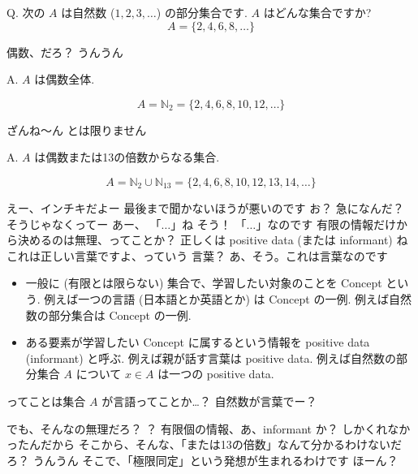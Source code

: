 \begin{boxnote}
Q. 次の $A$ は自然数 ($1, 2, 3, \ldots$) の部分集合です.  $A$ はどんな集合ですか?
$$A = \{2, 4, 6, 8, \ldots\}$$
\end{boxnote}

\YUI 偶数、だろ？
\YUKARI うんうん

\begin{boxnote}
    A. $A$ は偶数全体.

    $$A = \mathbb{N}_{2} = \{2, 4, 6, 8, 10, 12, \ldots\}$$
\end{boxnote}

\YUZUKO ざんね〜ん
\YUZUKO とは限りません

\begin{boxnote}
    A. $A$ は偶数または13の倍数からなる集合.

    $$A = \mathbb{N}_{2} \cup \mathbb{N}_{13} = \{2, 4, 6, 8, 10, 12, 13, 14, \ldots\}$$
\end{boxnote}

\YUKARI えー、インチキだよー
\YUZUKO 最後まで聞かないほうが悪いのです
\YUI お？ 急になんだ？
\YUZUKO そうじゃなくってー
\YUKARI あー、 「$\dots$」ね
\YUZUKO そう！ 「$\dots$」なのです
\YUI 有限の情報だけから決めるのは無理、ってことか？
\YUZUKO 正しくは positive data (または informant) ね
\YUZUKO これは正しい言葉ですよ、っていう
\YUKARI 言葉？
\YUZUKO あ、そう。これは言葉なのです

\begin{boxnote}
    \begin{itemize}
        \item
            一般に (有限とは限らない) 集合で、学習したい対象のことを Concept という.
            例えば一つの言語 (日本語とか英語とか) は Concept の一例.
            例えば自然数の部分集合は Concept の一例.
        \item
            ある要素が学習したい Concept に属するという情報を positive data (informant) と呼ぶ.
            例えば親が話す言葉は positive data.
            例えば自然数の部分集合 $A$ について $x \in A$ は一つの positive data.
    \end{itemize}
\end{boxnote}

\YUI ってことは集合 $A$ が言語ってことか…？
\YUKARI 自然数が言葉でー？

\PAUSE

\YUI でも、そんなの無理だろ？
\YUZUKO ？
\YUI 有限個の情報、あ、informant か？ しかくれなかったんだから
\YUI そこから、そんな、「または13の倍数」なんて分かるわけないだろ？
\YUKARI うんうん
\YUZUKO そこで、「極限同定」という発想が生まれるわけです
\YUI ほーん？

